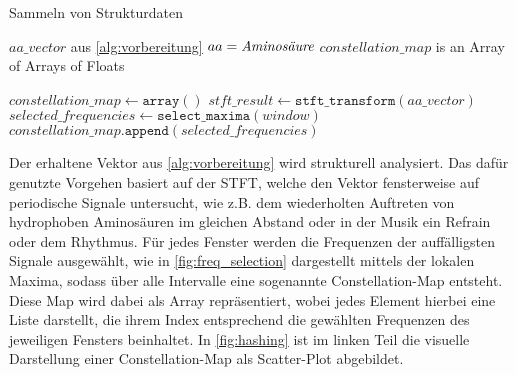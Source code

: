         \begin{algorithm}[H]
            \caption{Sammeln von Strukturdaten}\label{alg:strukturdaten}
            \begin{algorithmic}[1]
                \Require $aa\_vector$ aus \autoref{alg:vorbereitung} \Comment $aa = \emph{Aminosäure}$
                \Ensure $constellation\_map$ is an Array of Arrays of Floats

                \State $constellation\_map \gets \texttt{array}()$
                \State $stft\_result \gets \texttt{stft\_transform}(aa\_vector)$
                    \State $selected\_frequencies \gets \texttt{select\_maxima}(window)$
                    \State $constellation\_map.\texttt{append}(selected\_frequencies)$
                \EndFor
            \end{algorithmic}
        \end{algorithm}
        Der erhaltene Vektor aus \autoref{alg:vorbereitung} wird strukturell analysiert. Das dafür genutzte Vorgehen basiert auf der \ac{STFT}, welche den Vektor fensterweise auf periodische Signale untersucht, wie z.B. dem wiederholten Auftreten von hydrophoben Aminosäuren im gleichen Abstand oder in der Musik ein Refrain oder dem Rhythmus. Für jedes Fenster werden die Frequenzen der auffälligsten Signale ausgewählt, wie in \autoref{fig:freq_selection} dargestellt mittels der lokalen Maxima, sodass über alle Intervalle eine sogenannte Constellation-Map entsteht. Diese Map wird dabei als Array repräsentiert, wobei jedes Element hierbei eine Liste darstellt, die ihrem Index entsprechend die gewählten Frequenzen des jeweiligen Fensters beinhaltet. In \autoref{fig:hashing} ist im linken Teil die visuelle Darstellung einer Constellation-Map als Scatter-Plot abgebildet.

